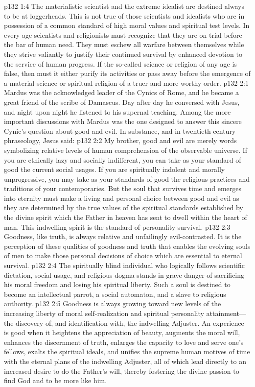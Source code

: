 \vs p132 1:4 The materialistic scientist and the extreme idealist are destined always to be at loggerheads. This is not true of those scientists and idealists who are in possession of a common standard of high moral values and spiritual test levels. In every age scientists and religionists must recognize that they are on trial before the bar of human need. They must eschew all warfare between themselves while they strive valiantly to justify their continued survival by enhanced devotion to the service of human progress. If the so\hyp{}called science or religion of any age is false, then must it either purify its activities or pass away before the emergence of a material science or spiritual religion of a truer and more worthy order.
\vs p132 2:1 Mardus was the acknowledged leader of the Cynics of Rome, and he became a great friend of the scribe of Damascus. Day after day he conversed with Jesus, and night upon night he listened to his supernal teaching. Among the more important discussions with Mardus was the one designed to answer this sincere Cynic’s question about good and evil. In substance, and in twentieth\hyp{}century phraseology, Jesus said:
\pc \vs p132 2:2 My brother, good and evil are merely words symbolizing relative levels of human comprehension of the observable universe. If you are ethically lazy and socially indifferent, you can take as your standard of good the current social usages. If you are spiritually indolent and morally unprogressive, you may take as your standards of good the religious practices and traditions of your contemporaries. But the soul that survives time and emerges into eternity must make a living and personal choice between good and evil as they are determined by the true values of the spiritual standards established by the divine spirit which the Father in heaven has sent to dwell within the heart of man. This indwelling spirit is the standard of personality survival.
\vs p132 2:3 Goodness, like truth, is always relative and unfailingly evil\hyp{}contrasted. It is the perception of these qualities of goodness and truth that enables the evolving souls of men to make those personal decisions of choice which are essential to eternal survival.
\vs p132 2:4 The spiritually blind individual who logically follows scientific dictation, social usage, and religious dogma stands in grave danger of sacrificing his moral freedom and losing his spiritual liberty. Such a soul is destined to become an intellectual parrot, a social automaton, and a slave to religious authority.
\vs p132 2:5 Goodness is always growing toward new levels of the increasing liberty of moral self\hyp{}realization and spiritual personality attainment---the discovery of, and identification with, the indwelling Adjuster. An experience is good when it heightens the appreciation of beauty, augments the moral will, enhances the discernment of truth, enlarges the capacity to love and serve one’s fellows, exalts the spiritual ideals, and unifies the supreme human motives of time with the eternal plans of the indwelling Adjuster, all of which lead directly to an increased desire to do the Father’s will, thereby fostering the divine passion to find God and to be more like him.

